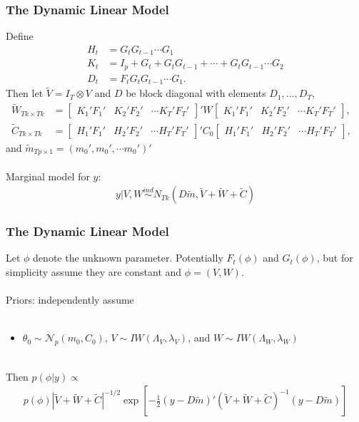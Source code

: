 \documentclass[xcolor=dvipsnames]{beamer}
\newcommand\N{\mathcal{N}}
\begin{document}
\begin{frame}
  \frametitle{The Dynamic Linear Model} 
Define 
\begin{align*}
H_t &= G_tG_{t-1}\cdots G_1\\ 
K_t &= I_p + G_t + G_tG_{t-1} + \cdots + G_tG_{t-1}\cdots G_2\\ 
D_t &= F_tG_tG_{t-1}\cdots G_1.
\end{align*} Then let $\tilde{V}=I_T\otimes V$ and $D$ be block diagonal with elements $D_1,\ldots,D_T$, 
\begin{align*}
\tilde{W}_{Tk\times Tk} &= \begin{bmatrix} K_1'F_1' & K_2'F_2' & \cdots K_T'F_T' \end{bmatrix}' W \begin{bmatrix} K_1'F_1' & K_2'F_2' & \cdots K_T'F_T' \end{bmatrix}, &\\
\tilde{C}_{Tk\times Tk} &= \begin{bmatrix} H_1'F_1' & H_2'F_2' & \cdots H_T'F_T' \end{bmatrix}' C_0 \begin{bmatrix} H_1'F_1' & H_2'F_2' & \cdots H_T'F_T' \end{bmatrix},&
\end{align*}
and $\tilde{m}_{Tp\times 1} = (m_0', m_0', \cdots m_0')'$\\~\\

Marginal model for $y$: 
\begin{align*}
  y|V,W \stackrel{ind}{\sim} N_{Tk}(D\tilde{m}, \tilde{V} + \tilde{W} + \tilde{C})
\end{align*}
\end{frame}

\begin{frame}
  \frametitle{The Dynamic Linear Model} 
Let $\phi$ denote the unknown parameter. Potentially $F_t(\phi)$ and $G_t(\phi)$, but for simplicity assume they are constant and $\phi=(V,W)$.\\~\\

Priors: independently assume \\~\\
\begin{itemize}
\item[]$\theta_0\sim \N_p(m_0,C_0)$, $V\sim IW(\Lambda_V,\lambda_V)$, and $W\sim IW(\Lambda_W,\lambda_W)$\\~\\
\end{itemize}

Then $p(\phi|y)\propto$
\begin{align*}
p(\phi)|\tilde{V} + \tilde{W} + \tilde{C}|^{-1/2}\exp\left[-\frac{1}{2}\left(y-D\tilde{m}\right)'(\tilde{V} + \tilde{W} + \tilde{C})^{-1}\left(y-D\tilde{m}\right)\right]
\end{align*}
\end{frame}
\end{document}
